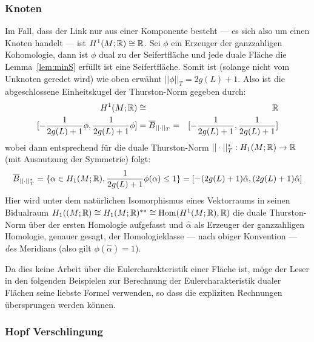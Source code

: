         \subsubsection*{Knoten}

        Im Fall, dass der Link nur aus einer Komponente besteht --- es sich also um einen Knoten handelt --- ist $H^1(M;\mathbb{R})\cong \mathbb{R}$. Sei $\phi$ ein Erzeuger der ganzzahligen Kohomologie, dann ist $\phi$ dual zu der Seifertfläche und jede duale Fläche die Lemma~\ref{lem:minS} erfüllt ist eine Seifertfläche. Somit ist (solange nicht vom Unknoten geredet wird) wie oben erwähnt $||\phi||_T=2g(L)+1$. Also ist die abgeschlossene Einheitskugel der Thurston-Norm gegeben durch:
        \begin{eqnarray*}
            H^1(M;\mathbb{R}) &\cong & \mathbb{R} \\
            {[- \frac{1}{2g(L)+1} \phi,\frac 1 {2g(L)+1} \phi]} & = \overline B_{||\cdot||_T}=& {[- \frac 1 {2g(L)+1}, \frac 1 {2g(L)+1}]}
        \end{eqnarray*}
        wobei dann entsprechend für die duale Thurston-Norm $||\cdot||_T^* : H_1(M;\mathbb{R})\to \mathbb{R}$ (mit Ausnutzung der Symmetrie) folgt:
        \[
            \overline B_{||\cdot||_T^*} = \{\alpha \in H_1(M;\mathbb{R}), \frac{1}{2g(L)+1}\phi (\alpha)\leq 1\} = {[-(2g(L)+1)\hat \alpha, (2g(L)+1) \hat \alpha]}
        \]
        Hier wird unter dem natürlichen Isomorphismus eines Vektorraums in seinen Bidualraum $H_1((M;\mathbb{R}) \cong H_1(M;\mathbb{R})^{**} \cong \operatorname{Hom}(H^1(M;\mathbb{R}),\mathbb{R})$ die duale Thurston-Norm über der ersten Homologie aufgefasst und $\hat \alpha$ als Erzeuger der ganzzahligen Homologie, genauer gesagt, der Homologieklasse --- nach obiger Konvention --- \emph{des} Meridians (also gilt $\phi(\hat \alpha)=1$). 
        \begin{bem}
            Da dies keine Arbeit über die Eulercharakteristik einer Fläche ist, möge der Leser in den folgenden Beispielen zur Berechnung der Eulercharakteristik dualer Flächen seine liebste Formel verwenden, so dass die expliziten Rechnungen übersprungen werden können.
        \end{bem}
        \subsubsection*{Hopf Verschlingung}

